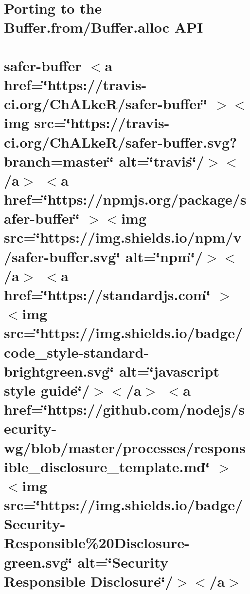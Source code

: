 \documentclass[twoside]{book}
\newcommand{\+}{\discretionary{\mbox{\scriptsize$\hookleftarrow$}}{}{}}
\begin{document}
\chapter{Porting to the Buffer.\+from/\+Buffer.alloc API}
\label{md__c___users_vaishnavi_jadhav__desktop__developer_code_mean_stack_example_client_node_modules_safer_buffer__porting__buffer}

\chapter{safer-\/buffer \texorpdfstring{$<$}{<}a href=\char`\"{}https\+://travis-\/ci.\+org/\+Ch\+ALke\+R/safer-\/buffer\char`\"{} \texorpdfstring{$>$}{>}\texorpdfstring{$<$}{<}img src=\char`\"{}https\+://travis-\/ci.\+org/\+Ch\+ALke\+R/safer-\/buffer.\+svg?branch=master\char`\"{} alt=\char`\"{}travis\char`\"{}/\texorpdfstring{$>$}{>}\texorpdfstring{$<$}{<}/a\texorpdfstring{$>$}{>} \texorpdfstring{$<$}{<}a href=\char`\"{}https\+://npmjs.\+org/package/safer-\/buffer\char`\"{} \texorpdfstring{$>$}{>}\texorpdfstring{$<$}{<}img src=\char`\"{}https\+://img.\+shields.\+io/npm/v/safer-\/buffer.\+svg\char`\"{} alt=\char`\"{}npm\char`\"{}/\texorpdfstring{$>$}{>}\texorpdfstring{$<$}{<}/a\texorpdfstring{$>$}{>} \texorpdfstring{$<$}{<}a href=\char`\"{}https\+://standardjs.\+com\char`\"{} \texorpdfstring{$>$}{>}\texorpdfstring{$<$}{<}img src=\char`\"{}https\+://img.\+shields.\+io/badge/code\+\_\+style-\/standard-\/brightgreen.\+svg\char`\"{} alt=\char`\"{}javascript style guide\char`\"{}/\texorpdfstring{$>$}{>}\texorpdfstring{$<$}{<}/a\texorpdfstring{$>$}{>} \texorpdfstring{$<$}{<}a href=\char`\"{}https\+://github.\+com/nodejs/security-\/wg/blob/master/processes/responsible\+\_\+disclosure\+\_\+template.\+md\char`\"{} \texorpdfstring{$>$}{>}\texorpdfstring{$<$}{<}img src=\char`\"{}https\+://img.\+shields.\+io/badge/\+Security-\/\+Responsible\%20\+Disclosure-\/green.\+svg\char`\"{} alt=\char`\"{}\+Security Responsible Disclosure\char`\"{}/\texorpdfstring{$>$}{>}\texorpdfstring{$<$}{<}/a\texorpdfstring{$>$}{>}}
\label{md__c___users_vaishnavi_jadhav__desktop__developer_code_mean_stack_example_client_node_modules_safer_buffer__readme}

\end{document}
